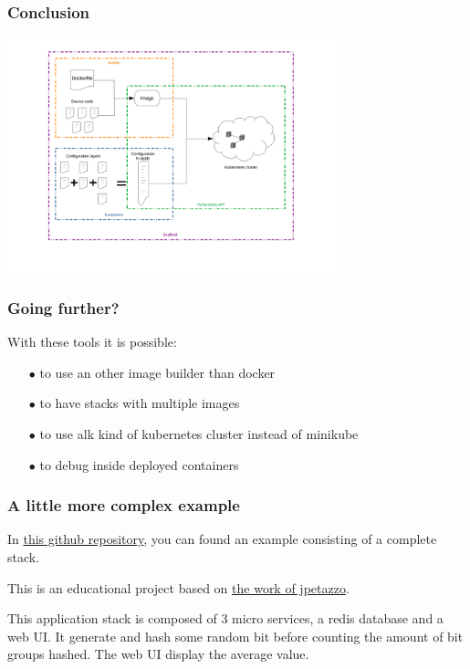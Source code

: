 \section*{}

	\begin{frame}
		\frametitle{Conclusion}
		
		\begin{center}
		\includegraphics[height=6.8cm]{../../../resources/color/skaffoldKustomizeArchitecture.pdf}
		\end{center}
		
	\end{frame}
	
	\begin{frame}
		\frametitle{Going further?}
		
		With these tools it is possible:
		\begin{itemize}
			\item[$\bullet$] to use an other image builder than docker
			\item[$\bullet$] to have stacks with multiple images
			\item[$\bullet$] to use alk kind of kubernetes cluster instead of minikube
			\item[$\bullet$] to debug inside deployed containers
		\end{itemize}
	\end{frame}
	
	\begin{frame}
		\frametitle{A little more complex example}
		
		In \href{https://github.com/Tinkou/kubercoins}{this github repository}, you can found an example consisting of a complete stack.
		
		\bigskip
		
		This is an educational project based on \href{https://github.com/jpetazzo/dockercoins}{the work of jpetazzo}.
		
		\medskip
		
		This application stack is composed of 3 micro services, a redis database and a web UI. It generate and hash some random bit before counting the amount of bit groups hashed. The web UI display the average value.
		
	\end{frame}
	
